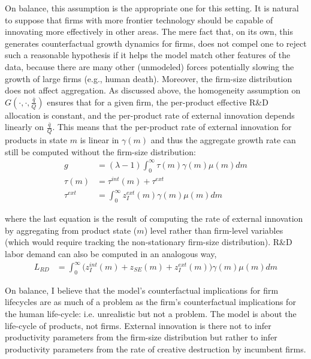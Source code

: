 \documentclass[12pt,english]{article}
\theoremstyle{remark}
\begin{document}
On balance, this assumption is the appropriate one for this setting. It is natural to suppose that firms with more frontier technology should be capable of innovating more effectively in other areas. The mere fact that, on its own, this generates counterfactual growth dynamics for firms, does not compel one to reject such a reasonable hypothesis if it helps the model match other features of the data, because there are many other (unmodeled) forces potentially slowing the growth of large firms (e.g., human death).  Moreover, the firm-size distribution does not affect aggregation. As discussed above, the homogeneity assumption on $G(\cdot,\cdot,\frac{\bar{q}}{Q})$ ensures that for a given firm, the per-product effective R\&D allocation is constant, and the per-product rate of external innovation depends linearly on $\frac{\bar{q}}{Q}$. This means that the per-product rate of external innovation for products in state $m$ is linear in $\gamma(m)$ and thus the aggregate growth rate can still be computed without the firm-size distribution: 
\begin{align*}
	g &= (\lambda -1) \int_0^{\infty} \tau(m) \gamma(m) \mu(m) dm \\
	\tau(m) &= \tau^{int} (m) + \tau^{ext} \\
	\tau^{ext} &= \int_0^{\infty} z_I^{ext} (m) \gamma(m) \mu(m) dm
\end{align*}

where the last equation is the result of computing the rate of external innovation by aggregating from product state ($m$) level rather than firm-level variables (which would require tracking the non-stationary firm-size distribution). R\&D labor demand can also be computed in an analogous way,
\begin{align*}
	L_{RD} &= \int_0^{\infty} \Big( z_I^{int}(m) + z_{SE}(m) + z_I^{ext}(m) \Big) \gamma(m) \mu(m) dm
\end{align*}

On balance, I believe that the model's counterfactual implications for firm lifecycles are as much of a problem as the firm's counterfactual implications for the human life-cycle: i.e. unrealistic but not a problem. The model is about the life-cycle of products, not firms. External innovation is there not to infer productivity parameters from the firm-size distribution but rather to infer productivity parameters from the rate of creative destruction by incumbent firms. 
\end{document}
